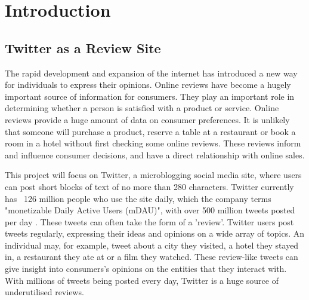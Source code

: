 

\chapter{Introduction}

\section{Twitter as a Review Site}
The rapid development and expansion of the internet has introduced a new way for individuals to express their opinions. Online reviews have become a hugely important source of information for consumers. They play an important role in determining whether a person is satisfied with a product or service. Online reviews provide a huge amount of data on consumer preferences. It is unlikely that someone will purchase a product, reserve a table at a restaurant or book a room in a hotel without first checking some online reviews. These reviews inform and influence consumer decisions, and have a direct relationship with online sales. 

This project will focus on Twitter, a microblogging social media site, where users can post short blocks of text of no more than 280 characters. Twitter currently has ~126 million people who use the site daily, which the company terms "monetizable Daily Active Users (mDAU)",
with over 500 million tweets posted per day \cite{Twitter2019}. These tweets can often take the form of a 'review'.
Twitter users post tweets regularly, expressing their ideas and opinions on a wide array of topics. An individual may, for example, tweet about a city they visited, a hotel they stayed in, a restaurant they ate at or a film they watched. These review-like tweets can give insight into consumers’s opinions on the entities that they interact with. With millions of tweets being posted every day, Twitter is a huge source of underutilised reviews.

